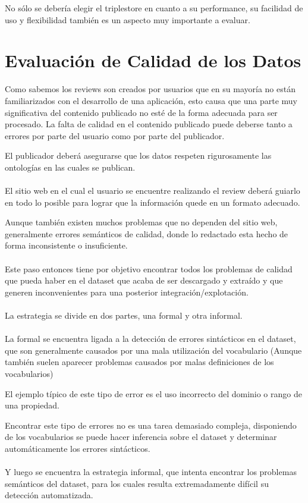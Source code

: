 No sólo se debería elegir el triplestore en cuanto a su performance, su facilidad de uso y flexibilidad también es un aspecto muy importante a evaluar.

%

 

\section{Evaluación de Calidad de los Datos} 
\label{section:evaluacion}
Como sabemos los reviews son creados por usuarios que en su mayoría no están familiarizados con el desarrollo de una 
aplicación, esto causa que una parte muy significativa del contenido publicado no esté de la forma adecuada para ser procesado. 
La falta de calidad en el contenido publicado puede deberse tanto a errores por parte del usuario como por parte del publicador.

El publicador deberá asegurarse que los datos respeten rigurosamente las ontologías en las cuales se publican.
\\\\
El sitio web en el cual el usuario se encuentre realizando el review deberá guiarlo en todo lo posible para lograr que la información
quede en un formato adecuado.

Aunque también existen muchos problemas que no dependen del sitio web, generalmente errores semánticos de calidad, donde lo 
redactado esta hecho de forma inconsistente o insuficiente.
\\\\
Este paso entonces tiene por objetivo encontrar todos los problemas de calidad que pueda haber en el dataset que acaba de 
ser descargado y extraído y que generen inconvenientes para una posterior integración/explotación.
\\\\
La estrategia se divide en dos partes, una formal y otra informal.
\\\\
La formal se encuentra ligada a la detección de errores sintácticos en el dataset, que son generalmente causados por una mala utilización del vocabulario (Aunque también suelen aparecer problemas causados por malas definiciones de los vocabularios)

El ejemplo típico de este tipo de error es el uso incorrecto del dominio o rango de una propiedad. 

Encontrar este tipo de errores no es una tarea demasiado compleja, disponiendo de los vocabularios se puede hacer inferencia sobre el dataset y determinar automáticamente los errores sintácticos.
\\\\
Y luego se encuentra la estrategia informal, que intenta encontrar los problemas semánticos del dataset, para los cuales resulta extremadamente difícil su detección automatizada.

